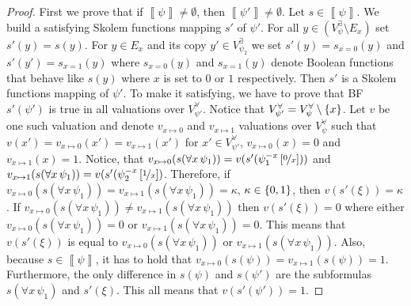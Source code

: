 \documentclass[
  digital, %
  twoside, %
  table,   %
  nolof,     %
  nolot,     %
]{fithesis3}
\let\setbuilder\set
\newcommand{\simpleset}[1]{\{{#1}\}}
\renewcommand{\set}[1]{\normalexpandarg\IfSubStr{#1}{|}{\setbuilder{#1}}{\simpleset{#1}}}
\theoremstyle{definition}
\theoremstyle{remark}
\newcommand{\seman}[1]{\left\llbracket {#1} \right\rrbracket}
\newcommand{\substitute}[2]{\left[ \nicefrac{#2}{#1} \right]}
\newcommand{\evars}[1]{V_{#1}^{\exists}}
\newcommand{\uvars}[1]{V_{#1}^{\forall}}
\newcommand{\itholds}{\,}
\begin{document}
\begin{proof}
  First we prove that if $\seman{\psi} \not= \emptyset$, then $\seman{\psi'} \not= \emptyset$. Let $s \in \seman{\psi}$. We build a satisfying Skolem functions mapping $s'$ of $\psi'$. For all $y \in (\evars{\psi} \setminus E_x)$ set $s'(y) = s(y)$. For $y \in E_x$ and its copy $y' \in \evars{\psi_2}$ we set $s'(y) = s_{x=0}(y)$ and $s'(y') = s_{x=1}(y)$ where $s_{x=0}(y)$ and $s_{x=1}(y)$ denote Boolean functions that behave like $s(y)$ where $x$ is set to $0$ or $1$ respectively. Then $s'$ is a Skolem functions mapping of $\psi'$. To make it satisfying, we have to prove that BF $s'(\psi')$ is true in all valuations over $\uvars{\psi'}$. Notice that $\uvars{\psi'} = \uvars{\psi} \setminus \set{x}$. Let $v$ be one such valuation and denote $v_{x\mapsto0}$ and $v_{x\mapsto1}$ valuations over $\uvars{\psi}$ such that $v(x') = v_{x\mapsto0}(x') = v_{x\mapsto1}(x')$ for $x' \in \uvars{\psi'}$, $v_{x\mapsto0}(x) = 0$ and $v_{x\mapsto1}(x) = 1$. Notice, that $v_{x\mapsto0}(s(\forall x\itholds\psi_1)) = v(s'(\psi_1^{-x}\substitute{x}{0}))$ and $v_{x\mapsto1}(s(\forall x\itholds\psi_1)) = v(s'(\psi_2^{-x}\substitute{x}{1})$. Therefore, if $v_{x\mapsto0}(s(\forall x\itholds\psi_1)) = v_{x\mapsto1}(s(\forall x\itholds\psi_1)) = \kappa$, $\kappa \in \set{0,1}$, then $v(s'(\xi)) = \kappa$. If $v_{x\mapsto0}(s(\forall x\itholds\psi_1)) \not= v_{x\mapsto1}(s(\forall x\itholds\psi_1))$ then $v(s'(\xi)) = 0$ where either $v_{x\mapsto0}(s(\forall x\itholds\psi_1)) = 0$ or $v_{x\mapsto1}(s(\forall x\itholds\psi_1)) = 0$. This means that $v(s'(\xi))$ is equal to $v_{x\mapsto0}(s(\forall x\itholds\psi_1))$ or $v_{x\mapsto1}(s(\forall x\itholds\psi_1))$. Also, because $s \in \seman{\psi}$, it has to hold that $v_{x\mapsto0}(s(\psi)) = v_{x\mapsto1}(s(\psi)) = 1$. Furthermore, the only difference in $s(\psi)$ and $s(\psi')$ are the subformulas $s(\forall x\itholds\psi_1)$ and $s'(\xi)$. This all means that $v(s'(\psi')) = 1$.


\end{proof}
\end{document}
